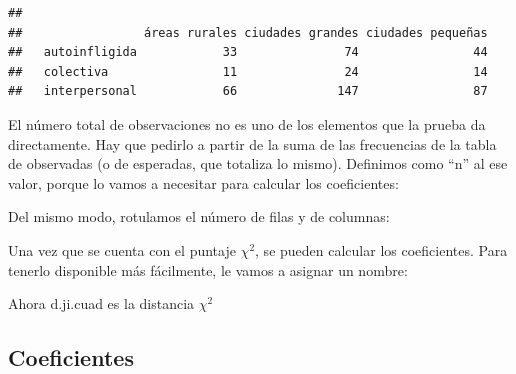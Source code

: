 \documentclass[]{book}
\newenvironment{Shaded}{\begin{snugshade}}{\end{snugshade}}
\newcommand{\KeywordTok}[1]{\textcolor[rgb]{0.13,0.29,0.53}{\textbf{#1}}}
\newcommand{\NormalTok}[1]{#1}
\newcommand{\OperatorTok}[1]{\textcolor[rgb]{0.81,0.36,0.00}{\textbf{#1}}}
\newcommand{\StringTok}[1]{\textcolor[rgb]{0.31,0.60,0.02}{#1}}
\begin{document}
\begin{verbatim}
##                
##                 áreas rurales ciudades grandes ciudades pequeñas
##   autoinfligida            33               74                44
##   colectiva                11               24                14
##   interpersonal            66              147                87
\end{verbatim}

El número total de observaciones no es uno de los elementos que la prueba da directamente. Hay que pedirlo a partir de la suma de las frecuencias de la tabla de observadas (o de esperadas, que totaliza lo mismo). Definimos como ``n'' al ese valor, porque lo vamos a necesitar para calcular los coeficientes:

\begin{Shaded}
\end{Shaded}

Del mismo modo, rotulamos el número de filas y de columnas:

\begin{Shaded}
\end{Shaded}

Una vez que se cuenta con el puntaje \(\chi^{2}\), se pueden calcular los coeficientes. Para tenerlo disponible más fácilmente, le vamos a asignar un nombre:

\begin{Shaded}
\end{Shaded}

Ahora d.ji.cuad es la distancia \(\chi^{2}\)

\hypertarget{coeficientes}{%
\subsection{Coeficientes}\label{coeficientes}}
\end{document}
